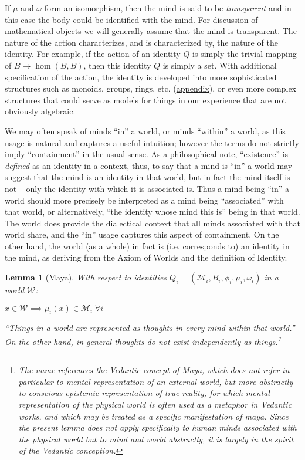 \documentclass[pra,twocolumn,groupedaddress,10pt]{revtex4}
\newtheorem{lemma}[theorem]{Lemma}
\theoremstyle{definition}
\begin{document}
If $\mu$ and $\omega$ form an isomorphism, then the mind is said to be \emph{transparent} and in this case the body could be identified with the mind. For discussion of mathematical objects we will generally assume that the mind is transparent. The nature of the action characterizes, and is characterized by, the nature of the identity. For example, if the action of an identity $Q$ is simply the trivial mapping of $B \rightarrow \hom(B,B)$, then this identity $Q$ is simply a set. With additional specification of the action, the identity is developed into more sophisticated structures such as monoids, groups, rings, etc. (\hyperref[app:algact]{appendix}), or even more complex structures that could serve as models for things in our experience that are not obviously algebraic.

We may often speak of minds ``in'' a world, or minds ``within'' a world, as this usage is natural and captures a useful intuition; however the terms do not strictly imply ``containment'' in the usual sense. As a philosophical note, ``existence'' is \textit{defined} as an identity in a context, thus, to say that a mind is ``in'' a world may suggest that the mind is an identity in that world, but in fact the mind itself is not -- only the identity with which it is associated is. Thus a mind being ``in'' a world should more precisely be interpreted as a mind being ``associated'' with that world, or alternatively, ``the identity whose mind this is'' being in that world. The world does provide the dialectical context that all minds associated with that world share, and the ``in'' usage captures this aspect of containment. On the other hand, the world (as a whole) in fact is (i.e. corresponds to) an identity in the mind, as deriving from the Axiom of Worlds and the definition of Identity.

\begin{lemma}[Maya] \label{lem:maya}
	With respect to identities $Q_i = (\mathcal{M}_i, B_i, \phi_i, \mu_i, \omega_i)$ in a world $\mathcal{W}$:
	\begin{center}
		$x \in \mathcal{W} \implies \mu_i(x) \in \mathcal{M}_i \; \forall i$
	\end{center}
	``Things in a world are represented as thoughts in every mind within that world.'' On the other hand, in general thoughts do not exist independently as things.\footnote{The name references the Vedantic concept of \emph{M\={a}y\={a}}, which does not refer in particular to mental representation of an external world, but more abstractly to conscious epistemic representation of true reality, for which mental representation of the physical world is often used as a metaphor in Vedantic works, and which may be treated as a specific manifestation of maya. Since the present lemma does not apply specifically to human minds associated with the physical world but to mind and world abstractly, it is largely in the spirit of the Vedantic conception.}
\end{lemma}
\end{document}
